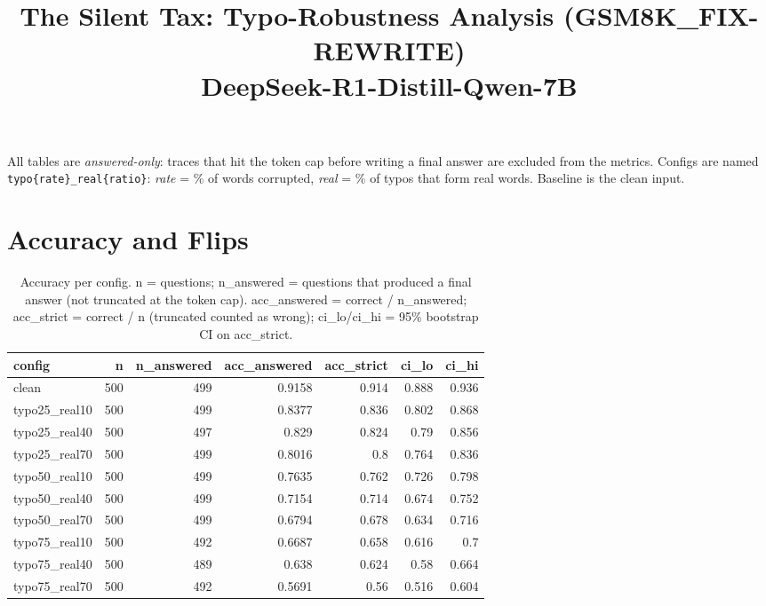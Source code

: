 \documentclass[11pt]{article}
\title{The Silent Tax: Typo-Robustness Analysis (GSM8K\_FIX-REWRITE)\\\large DeepSeek-R1-Distill-Qwen-7B}
\date{}
\begin{document}
\maketitle
\noindent All tables are \emph{answered-only}: traces that hit the token cap before writing a final answer are excluded from the metrics. Configs are named \texttt{typo\{rate\}\_real\{ratio\}}: \emph{rate} = \% of words corrupted, \emph{real} = \% of typos that form real words. Baseline is the clean input.

\section*{Accuracy and Flips}
\begin{table}[H]
\centering
\caption{Accuracy per config. n = questions; n\_answered = questions that produced a final answer (not truncated at the token cap). acc\_answered = correct / n\_answered; acc\_strict = correct / n (truncated counted as wrong); ci\_lo/ci\_hi = 95\% bootstrap CI on acc\_strict.}
\small
\begin{adjustbox}{max width=\textwidth}
\begin{tabular}{lrrrrrr}
\toprule
\textbf{config} & \textbf{n} & \textbf{n\_answered} & \textbf{acc\_answered} & \textbf{acc\_strict} & \textbf{ci\_lo} & \textbf{ci\_hi} \\
\midrule
clean & 500 & 499 & 0.9158 & 0.914 & 0.888 & 0.936 \\
typo25\_real10 & 500 & 499 & 0.8377 & 0.836 & 0.802 & 0.868 \\
typo25\_real40 & 500 & 497 & 0.829 & 0.824 & 0.79 & 0.856 \\
typo25\_real70 & 500 & 499 & 0.8016 & 0.8 & 0.764 & 0.836 \\
typo50\_real10 & 500 & 499 & 0.7635 & 0.762 & 0.726 & 0.798 \\
typo50\_real40 & 500 & 499 & 0.7154 & 0.714 & 0.674 & 0.752 \\
typo50\_real70 & 500 & 499 & 0.6794 & 0.678 & 0.634 & 0.716 \\
typo75\_real10 & 500 & 492 & 0.6687 & 0.658 & 0.616 & 0.7 \\
typo75\_real40 & 500 & 489 & 0.638 & 0.624 & 0.58 & 0.664 \\
typo75\_real70 & 500 & 492 & 0.5691 & 0.56 & 0.516 & 0.604 \\
\bottomrule
\end{tabular}
\end{adjustbox}
\end{table}
\end{document}
